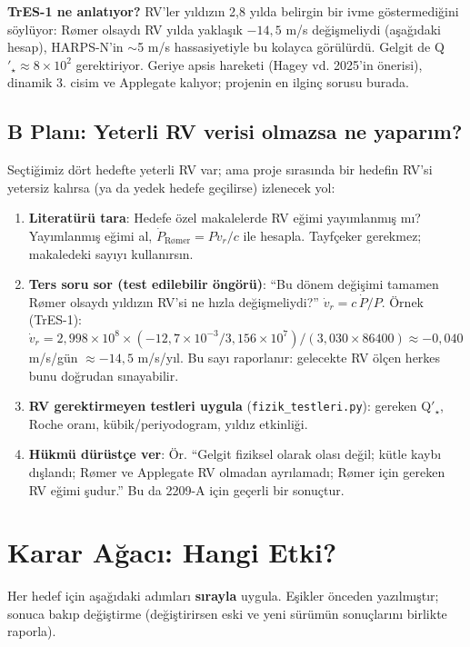 \textbf{TrES-1 ne anlatıyor?} RV'ler yıldızın 2,8 yılda belirgin bir ivme göstermediğini söylüyor: Rømer olsaydı RV
yılda yaklaşık $-14{,}5$ m/s değişmeliydi (aşağıdaki hesap), HARPS-N'in $\sim$5 m/s hassasiyetiyle bu kolayca görülürdü.
Gelgit de Q$'_\star \approx 8\times10^2$ gerektiriyor. Geriye apsis hareketi (Hagey vd. 2025'in önerisi), dinamik 3. cisim ve
Applegate kalıyor; projenin en ilginç sorusu burada.

\subsection{B Planı: Yeterli RV verisi olmazsa ne yaparım?}
Seçtiğimiz dört hedefte yeterli RV var; ama proje sırasında bir hedefin RV'si yetersiz kalırsa (ya da yedek hedefe geçilirse)
izlenecek yol:
\begin{enumerate}[leftmargin=*]
\item \textbf{Literatürü tara}: Hedefe özel makalelerde RV eğimi yayımlanmış mı? Yayımlanmış eğimi al,
      $\dot P_\text{Rømer} = P\dot v_r/c$ ile hesapla. Tayfçeker gerekmez; makaledeki sayıyı kullanırsın.
\item \textbf{Ters soru sor (test edilebilir öngörü)}: “Bu dönem değişimi tamamen Rømer olsaydı yıldızın RV'si ne hızla
      değişmeliydi?” $\dot v_r = c\,\dot P/P$. Örnek (TrES-1): $\dot v_r = 2{,}998\times10^8 \times
      (-12{,}7\times10^{-3}/3{,}156\times10^7) / (3{,}030\times86400) \approx -0{,}040$ m/s/gün $\approx -14{,}5$ m/s/yıl.
      Bu sayı raporlanır: gelecekte RV ölçen herkes bunu doğrudan sınayabilir.
\item \textbf{RV gerektirmeyen testleri uygula} (\texttt{fizik\_testleri.py}): gereken Q$'_\star$, Roche oranı, kübik/periyodogram,
      yıldız etkinliği.
\item \textbf{Hükmü dürüstçe ver}: Ör. “Gelgit fiziksel olarak olası değil; kütle kaybı dışlandı; Rømer ve Applegate RV
      olmadan ayrılamadı; Rømer için gereken RV eğimi şudur.” Bu da 2209-A için geçerli bir sonuçtur.
\end{enumerate}

\section{Karar Ağacı: Hangi Etki?}
\label{sec:karar}

Her hedef için aşağıdaki adımları \textbf{sırayla} uygula. Eşikler önceden yazılmıştır; sonuca bakıp değiştirme
(değiştirirsen eski ve yeni sürümün sonuçlarını birlikte raporla).

